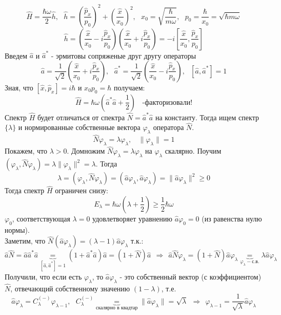 			$$
				\hat{H} = \frac{\hbar\omega}{2}\hat{h}, \ \ \ \hat{h} = \left(\frac{\hat{p}_x}{p_0}\right)^2+\left(\frac{\hat{x}}{x_0}\right)^2, \ \ \ x_0 = \sqrt{\frac{\hbar}{m\omega}}, \ \ \ p_0 = \frac{\hbar}{x_0} = \sqrt{\hbar m \omega}
			$$
			$$
				\hat{h} = \left(\frac{\hat{x}}{x_0} - i\frac{\hat{p}_x}{p_0}\right)\left(\frac{\hat{x}}{x_0}+i\frac{\hat{p}_x}{p_0}\right) = -i\left[\frac{\hat{x}}{x_0},\frac{\hat{p}_x}{p_0}\right]
			$$
			Введем $\hat{a}$ и $\hat{a}^{*}$ - эрмитовы сопряженые друг другу операторы
			$$
				\hat{a} = \frac{1}{\sqrt{2}}\left(\frac{\hat{x}}{x_0} + i\frac{\hat{p}_x}{p_0}\right), \ \ \ \hat{a}^{*} = \frac{1}{\sqrt{2}}\left(\frac{\hat{x}}{x_0} - i\frac{\hat{p}_x}{p_0}\right), \ \ \ \left[\hat{a},\hat{a}^{*}\right] = 1
			$$
			Зная, что $[\hat{x},\hat{p}_x] = i\hbar$ и $x_0p_0=\hbar$ получаем:
			$$
				\hat{H} = \hbar\omega(\hat{a}^{*}\hat{a} + \frac{1}{2}) \ \ \ \ \text{-факторизовали!}
			$$
			Спектр $\hat{H}$ будет отличаться от спектра $\hat{N}=\hat{a}^{*}\hat{a}$ на константу. Тогда ищем спектр $\{\lambda\}$ и нормированные собственные вектора $\varphi_{\lambda}$ оператора $\hat{N}$.
			$$
				\hat{N}\varphi_{\lambda} = \lambda\varphi_{\lambda}, \ \ \ \ \|\varphi_{\lambda}\|=1
			$$
			Покажем, что $\lambda>0$. Домножим $\hat{N}\varphi_{\lambda}=\lambda\varphi_{\lambda}$ на $\varphi_{\lambda}$ скалярно. Поучим $(\varphi_{\lambda}, \hat{N}\varphi_{\lambda})=\lambda\|\varphi_{\lambda}\|^2 = \lambda$. Тогда
			$$
				\lambda = (\varphi_{\lambda},\hat{N}\varphi_{\lambda}) = (\hat{a}\varphi_{\lambda},\hat{a}\varphi_{\lambda}) = \|\hat{a}\varphi_{\lambda}\|^2\ge0
			$$
			Тогда спектр $\hat{H}$ ограничен снизу:
			$$
				E_{\lambda} = \hbar\omega\left(\lambda + \frac{1}{2}\right) \ge \frac{1}{2}\hbar\omega 
			$$
			$\varphi_0$, соответствующая $\lambda = 0$ удовлетворяет уравнению $\hat{a}\varphi_0=0$ (из равенства нулю нормы).\\
			Заметим, что $\hat{N}(\hat{a}\varphi_{\lambda})=(\lambda-1)\hat{a}\varphi_{\lambda}$ т.к.:
			$$
				\hat{a}\hat{N}=\hat{a}\hat{a}^{*}\hat{a} \underbrace{=}_{\left[\hat{a},\hat{a}^{*}\right]=1} (1+\hat{a}^{*}\hat{a})\hat{a} = (1+\hat{N})\hat{a} \ \ \Rightarrow \ \ \hat{a}\hat{N}\varphi_{\lambda} = (1+\hat{N})\hat{a}\varphi_{\lambda} \underbrace{=}_{\varphi_{\lambda} - \text{с.в.}} \lambda\hat{a}\varphi_{\lambda}
			$$
			Получили, что если есть $\varphi_{\lambda}$, то $\hat{a}\varphi_{\lambda}$ - это собственный вектор (с коэффициентом) $\hat{N}$, отвечающий собственному значению $(1-\lambda)$, т.е.
			$$
				\hat{a}\varphi_{\lambda} = C_{\lambda}^{(-)}\varphi_{\lambda-1}, \ \ \ C_{\lambda}^{(-)} \underbrace{=}_{\text{скалярно в квадтар}} \|\hat{a}\varphi_{\lambda}\| = \sqrt{\lambda} \ \ \Rightarrow \ \ \varphi_{\lambda - 1} = \frac{1}{\sqrt{\lambda}}\hat{a}\varphi_{\lambda}
			$$
